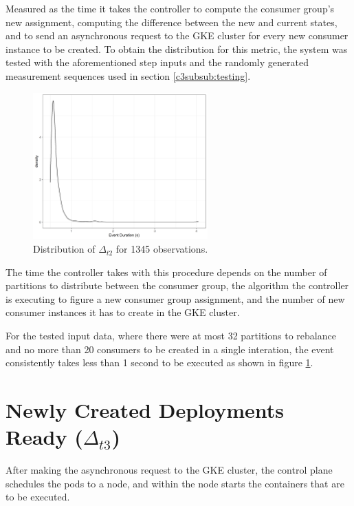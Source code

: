 Measured as the time it takes the controller to compute the consumer group's new
assignment, computing the difference between the new and current states, and to
send an asynchronous request to the GKE cluster for every new consumer instance
to be created. To obtain the distribution for this metric, the system was tested
with the aforementioned step inputs and the randomly generated measurement
sequences used in section \ref{c3subsub:testing}.

\begin{figure}[htb!]
\centering
\includegraphics[width=0.6\textwidth]{images/integration/delta2.png}
\caption{
    Distribution of $\Delta_{t2}$ for 1345 observations.
}
\label{fig:controller_result_trigger}
\end{figure}

The time the controller takes with this procedure depends on the number of
partitions to distribute between the consumer group, the algorithm the
controller is executing to figure a new consumer group assignment, and the
number of new consumer instances it has to create in the GKE cluster.

For the tested input data, where there were at most 32 partitions to rebalance
and no more than 20 consumers to be created in a single interation, the event
consistently takes less than 1 second to be executed as shown in figure
\ref{fig:controller_result_trigger}.

\section{Newly Created Deployments Ready ($\Delta_{t3}$)}

After making the asynchronous request to the GKE cluster, the control plane
schedules the pods to a node, and within the node starts the containers that are
to be executed.

